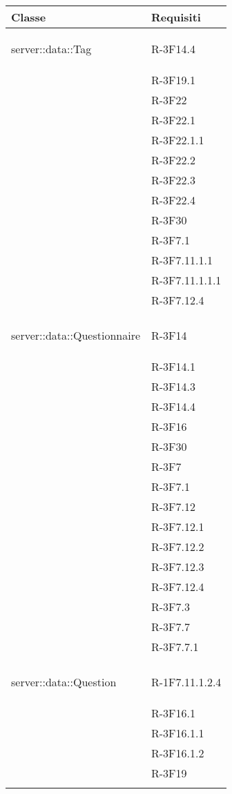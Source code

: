 \begin{longtable}{l p{3cm}}
\midrule
\textbf{Classe} & \textbf{Requisiti}\tabularnewline
\midrule
\midrule
\hypertarget{server::data::Tag}{server::data::Tag} & R-3F14.4 \tabularnewline &

R-3F19.1 \tabularnewline &

R-3F22 \tabularnewline &

R-3F22.1 \tabularnewline &

R-3F22.1.1 \tabularnewline &

R-3F22.2 \tabularnewline &

R-3F22.3 \tabularnewline &

R-3F22.4 \tabularnewline &

R-3F30 \tabularnewline &

R-3F7.1 \tabularnewline &

R-3F7.11.1.1 \tabularnewline &

R-3F7.11.1.1.1 \tabularnewline &

R-3F7.12.4 \tabularnewline &\tabularnewline
\midrule
\hypertarget{server::data::Questionnaire}{server::data::Questionnaire} & R-3F14 \tabularnewline &

R-3F14.1 \tabularnewline &

R-3F14.3 \tabularnewline &

R-3F14.4 \tabularnewline &

R-3F16 \tabularnewline &

R-3F30 \tabularnewline &

R-3F7 \tabularnewline &

R-3F7.1 \tabularnewline &

R-3F7.12 \tabularnewline &

R-3F7.12.1 \tabularnewline &

R-3F7.12.2 \tabularnewline &

R-3F7.12.3 \tabularnewline &

R-3F7.12.4 \tabularnewline &

R-3F7.3 \tabularnewline &

R-3F7.7 \tabularnewline &

R-3F7.7.1 \tabularnewline &\tabularnewline
\midrule
\hypertarget{server::data::Question}{server::data::Question} & R-1F7.11.1.2.4 \tabularnewline &

R-3F16.1 \tabularnewline &

R-3F16.1.1 \tabularnewline &

R-3F16.1.2 \tabularnewline &

R-3F19 \tabularnewline &


\end{longtable}
